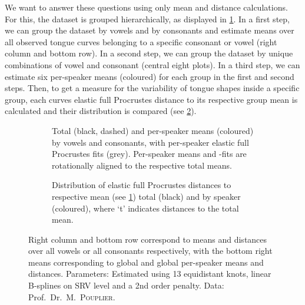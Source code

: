 We want to answer these questions using only mean and distance calculations.
For this, the dataset is grouped hierarchically, as displayed in \cref{fig:4-tongue-means}.
In a first step, we can group the dataset by vowels and by consonants and estimate means over all observed tongue curves belonging to a specific consonant or vowel (right column and bottom row).
In a second step, we can group the dataset by unique combinations of vowel and consonant (central eight plots).
In a third step, we can estimate six per-speaker means (coloured) for each group in the first and second steps.
Then, to get a measure for the variability of tongue shapes inside a specific group, each curves elastic full Procrustes distance to its respective group mean is calculated and their distribution is compared (see \cref{fig:4-tongue-dists}).
\begin{figure}
  \centering
  \advance\leftskip-1cm
  \begin{subfigure}[t]{0.72\textwidth}
    \centering
    \centering
    \caption{Total (black, dashed) and per-speaker means (coloured) by vowels and consonants, with per-speaker elastic full Procrustes fits (grey). 
    Per-speaker means and -fits are rotationally aligned to the respective total means.}
    \label{fig:4-tongue-means}
  \end{subfigure}%
  \begin{subfigure}[t]{0.40\textwidth}
    \centering
    \centering
    \caption{Distribution of elastic full Procrustes distances to respective mean (see \cref{fig:4-tongue-means}) total (black) and by speaker (coloured), where \enquote*{t} indicates distances to the total mean.}
    \label{fig:4-tongue-dists}
  \end{subfigure}
  \caption{Right column and bottom row correspond to means and distances over all vowels or all consonants respectively, with the bottom right means corresponding to global and global per-speaker means and distances.
    Parameters: Estimated using 13 equidistant knots, linear B-splines on SRV level and a 2nd order penalty.
    Data: Prof.\ Dr.\ M.\ \textsc{Pouplier}.}
  \label{fig:4-tounges}
\end{figure}

